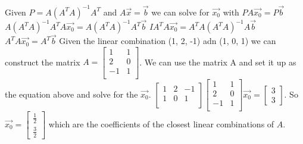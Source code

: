 		Given $P=A(A^TA)^{-1}A^T$ and $A\vec{x}=\vec{b}$ we can solve for $\vec{x_0}$ with $PA\vec{x_0}=P\vec{b}$
		\newline
		$A(A^TA)^{-1}A^TA\vec{x_0}=A(A^TA)^{-1}A^T\vec{b}$
	    \newline
	    $IA^TA\vec{x_0}=A^TA(A^TA)^{-1}A\vec{b}$
	    \newline
	    $A^TA\vec{x_0}=A^T\vec{b}$
	    \newline
	    Given the linear combination (1, 2, -1) adn (1, 0, 1) we can construct the matrix $A=\begin{bmatrix}
	        1 & 1 \\
	        2 & 0 \\
	        -1 & 1 \\
	    \end{bmatrix}$.
	    We can use the matrix A and set it up as the equation above and solve for the $\vec{x_0}$.
	    \newline
	    $\begin{bmatrix}
	        1 & 2 & -1 \\
	        1 & 0 & 1 \\
	    \end{bmatrix}
	    \begin{bmatrix}
	        1 & 1 \\
	        2 & 0 \\
	        -1 & 1 \\
	    \end{bmatrix}\vec{x_0}=\begin{bmatrix}
	        3 \\ 3
	    \end{bmatrix}$.
	    So $\vec{x_0}=\begin{bmatrix}
	        \frac{1}{2} \\ \frac{3}{2}
	    \end{bmatrix}$ which are the coefficients of the closest linear combinations of $A$.
